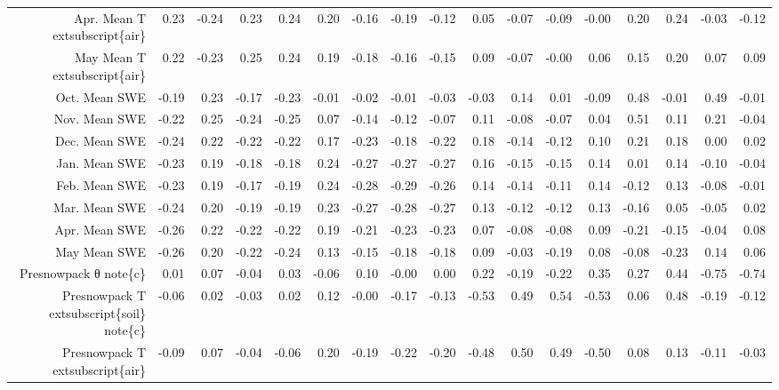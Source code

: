 \begin{table}[ht]
\begin{tabular}{rrrrrrrrrrrrrrrrr}
  Apr. Mean T	extsubscript\{air\} & 0.23 & -0.24 & 0.23 & 0.24 & 0.20 & -0.16 & -0.19 & -0.12 & 0.05 & -0.07 & -0.09 & -0.00 & 0.20 & 0.24 & -0.03 & -0.12 \\ 
  May Mean T	extsubscript\{air\} & 0.22 & -0.23 & 0.25 & 0.24 & 0.19 & -0.18 & -0.16 & -0.15 & 0.09 & -0.07 & -0.00 & 0.06 & 0.15 & 0.20 & 0.07 & 0.09 \\ 
  Oct. Mean SWE & -0.19 & 0.23 & -0.17 & -0.23 & -0.01 & -0.02 & -0.01 & -0.03 & -0.03 & 0.14 & 0.01 & -0.09 & 0.48 & -0.01 & 0.49 & -0.01 \\ 
  Nov. Mean SWE & -0.22 & 0.25 & -0.24 & -0.25 & 0.07 & -0.14 & -0.12 & -0.07 & 0.11 & -0.08 & -0.07 & 0.04 & 0.51 & 0.11 & 0.21 & -0.04 \\ 
  Dec. Mean SWE & -0.24 & 0.22 & -0.22 & -0.22 & 0.17 & -0.23 & -0.18 & -0.22 & 0.18 & -0.14 & -0.12 & 0.10 & 0.21 & 0.18 & 0.00 & 0.02 \\ 
  Jan. Mean SWE & -0.23 & 0.19 & -0.18 & -0.18 & 0.24 & -0.27 & -0.27 & -0.27 & 0.16 & -0.15 & -0.15 & 0.14 & 0.01 & 0.14 & -0.10 & -0.04 \\ 
  Feb. Mean SWE & -0.23 & 0.19 & -0.17 & -0.19 & 0.24 & -0.28 & -0.29 & -0.26 & 0.14 & -0.14 & -0.11 & 0.14 & -0.12 & 0.13 & -0.08 & -0.01 \\ 
  Mar. Mean SWE & -0.24 & 0.20 & -0.19 & -0.19 & 0.23 & -0.27 & -0.28 & -0.27 & 0.13 & -0.12 & -0.12 & 0.13 & -0.16 & 0.05 & -0.05 & 0.02 \\ 
  Apr. Mean SWE & -0.26 & 0.22 & -0.22 & -0.22 & 0.19 & -0.21 & -0.23 & -0.23 & 0.07 & -0.08 & -0.08 & 0.09 & -0.21 & -0.15 & -0.04 & 0.08 \\ 
  May Mean SWE & -0.26 & 0.20 & -0.22 & -0.24 & 0.13 & -0.15 & -0.18 & -0.18 & 0.09 & -0.03 & -0.19 & 0.08 & -0.08 & -0.23 & 0.14 & 0.06 \\ 
  Presnowpack θ	note\{c\} & 0.01 & 0.07 & -0.04 & 0.03 & -0.06 & 0.10 & -0.00 & 0.00 & 0.22 & -0.19 & -0.22 & 0.35 & 0.27 & 0.44 & -0.75 & -0.74 \\ 
  Presnowpack T	extsubscript\{soil\}	note\{c\} & -0.06 & 0.02 & -0.03 & 0.02 & 0.12 & -0.00 & -0.17 & -0.13 & -0.53 & 0.49 & 0.54 & -0.53 & 0.06 & 0.48 & -0.19 & -0.12 \\ 
  Presnowpack T	extsubscript\{air\} & -0.09 & 0.07 & -0.04 & -0.06 & 0.20 & -0.19 & -0.22 & -0.20 & -0.48 & 0.50 & 0.49 & -0.50 & 0.08 & 0.13 & -0.11 & -0.03 \\ 
   \hline
\end{tabular}
\end{table}
